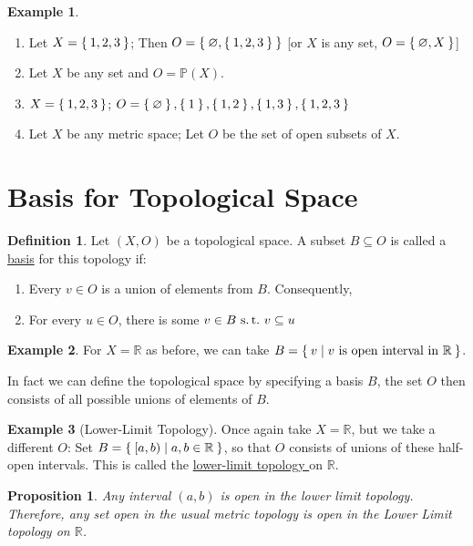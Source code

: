 \documentclass[12pt]{amsart}
\newcommand{\bbR}{\mathbb{R}}
\newcommand{\bbP}{\mathbb{P}}
\newcommand{\suchthat}{\operatorname{\thinspace s.t. \thinspace}}
\theoremstyle{plain}
\newtheorem*{prop}{Proposition}
\theoremstyle{remark}
\theoremstyle{definition}
\newtheorem*{define}{Definition}
\newtheorem*{eg}{Example}
\begin{document}
\begin{eg}
	\hfill
	\begin{enumerate}[$(1)$]
		\item
			Let $X = \Set{1,2,3}$; Then $O = \Set{\varnothing, \Set{1,2,3}}$ [or $X$ is any set, $O = \Set{\varnothing,X}$]
		\item
			Let $X$ be any set and $O = \bbP(X)$.
		\item
			$X = \Set{1,2,3}$; $O = \Set{\varnothing}, \Set{1}, \Set{1,2}, \Set{1,3}, \Set{1,2,3}$
		\item
			Let $X$ be any metric space; Let $O$ be the set of open subsets of $X$.
	\end{enumerate}
\end{eg}

\section*{Basis for Topological Space}

\begin{define}
	Let $(X, O)$ be a topological space. A subset $B \subseteq O$ is called a \ul{basis} for this topology if:
	\begin{enumerate}[$(1)$]
	\item Every $v \in O$ is a union of elements from $B$. Consequently,
	\item For every $u\in O$, there is some $v \in B \suchthat v \subseteq u$  
	\end{enumerate}
\end{define}

\begin{eg}
	For $X = \bbR$ as before, we can take $B = \Set{v|v \text{ is open interval in } \bbR}$. 
\end{eg}

\par
In fact we can define the topological space by specifying a basis $B$, the set $O$ then consists of all possible unions of elements of $B$.

\begin{eg}[Lower-Limit Topology]
	Once again take $X = \bbR$, but we take a different $O$: Set $B = \Set{[a,b)| a,b\in \bbR}$, so that $O$ consists of unions of these half-open intervals. This is called the \ul{lower-limit topology } on $\bbR$.
\end{eg}

\begin{prop}
	Any interval $(a,b)$ is open in the lower limit topology. Therefore, any set open in the usual metric topology is open in the Lower Limit topology on $\bbR$.	
\end{prop}
\end{document}
